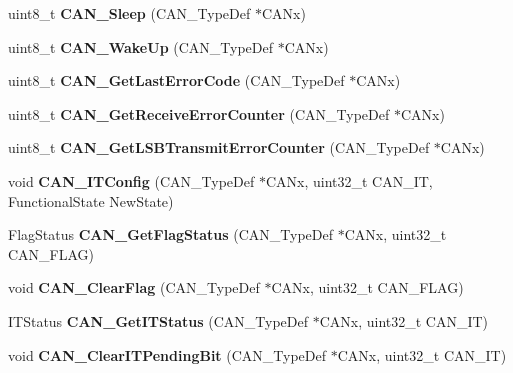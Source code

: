 \begin{DoxyCompactItemize}
\item 
\hypertarget{group__CAN__Exported__Functions_ga640215e38765759d7eceb8a039046667}{
uint8\_\-t {\bfseries CAN\_\-Sleep} (CAN\_\-TypeDef $\ast$CANx)}
\label{group__CAN__Exported__Functions_ga640215e38765759d7eceb8a039046667}

\item 
\hypertarget{group__CAN__Exported__Functions_ga78cdfbf1884b9e33c552bcbca15bed10}{
uint8\_\-t {\bfseries CAN\_\-WakeUp} (CAN\_\-TypeDef $\ast$CANx)}
\label{group__CAN__Exported__Functions_ga78cdfbf1884b9e33c552bcbca15bed10}

\item 
\hypertarget{group__CAN__Exported__Functions_gaaee721a392b6b21bfd15dc160aeb6924}{
uint8\_\-t {\bfseries CAN\_\-GetLastErrorCode} (CAN\_\-TypeDef $\ast$CANx)}
\label{group__CAN__Exported__Functions_gaaee721a392b6b21bfd15dc160aeb6924}

\item 
\hypertarget{group__CAN__Exported__Functions_ga6903eecbec40eb1361d915ddde9a3274}{
uint8\_\-t {\bfseries CAN\_\-GetReceiveErrorCounter} (CAN\_\-TypeDef $\ast$CANx)}
\label{group__CAN__Exported__Functions_ga6903eecbec40eb1361d915ddde9a3274}

\item 
\hypertarget{group__CAN__Exported__Functions_ga85ee0c35bf7ca15d4e4c862eef534843}{
uint8\_\-t {\bfseries CAN\_\-GetLSBTransmitErrorCounter} (CAN\_\-TypeDef $\ast$CANx)}
\label{group__CAN__Exported__Functions_ga85ee0c35bf7ca15d4e4c862eef534843}

\item 
\hypertarget{group__CAN__Exported__Functions_gad1a8b2499a780b5bfa4accb3597b02f4}{
void {\bfseries CAN\_\-ITConfig} (CAN\_\-TypeDef $\ast$CANx, uint32\_\-t CAN\_\-IT, FunctionalState NewState)}
\label{group__CAN__Exported__Functions_gad1a8b2499a780b5bfa4accb3597b02f4}

\item 
\hypertarget{group__CAN__Exported__Functions_ga2faad96caf823ef463cc5b5b25c480bb}{
FlagStatus {\bfseries CAN\_\-GetFlagStatus} (CAN\_\-TypeDef $\ast$CANx, uint32\_\-t CAN\_\-FLAG)}
\label{group__CAN__Exported__Functions_ga2faad96caf823ef463cc5b5b25c480bb}

\item 
\hypertarget{group__CAN__Exported__Functions_ga2c01646d5d3a2d7045e8dd71f58f8742}{
void {\bfseries CAN\_\-ClearFlag} (CAN\_\-TypeDef $\ast$CANx, uint32\_\-t CAN\_\-FLAG)}
\label{group__CAN__Exported__Functions_ga2c01646d5d3a2d7045e8dd71f58f8742}

\item 
\hypertarget{group__CAN__Exported__Functions_ga9aca05b3013e1b3438f3559f80b33c82}{
ITStatus {\bfseries CAN\_\-GetITStatus} (CAN\_\-TypeDef $\ast$CANx, uint32\_\-t CAN\_\-IT)}
\label{group__CAN__Exported__Functions_ga9aca05b3013e1b3438f3559f80b33c82}

\item 
\hypertarget{group__CAN__Exported__Functions_ga30bf7ac0c1793f6622a4a1adbb7dbc8a}{
void {\bfseries CAN\_\-ClearITPendingBit} (CAN\_\-TypeDef $\ast$CANx, uint32\_\-t CAN\_\-IT)}
\label{group__CAN__Exported__Functions_ga30bf7ac0c1793f6622a4a1adbb7dbc8a}

\end{DoxyCompactItemize}
